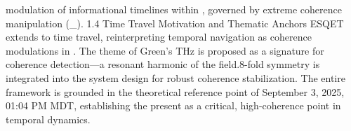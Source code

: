 modulation of informational timelines within , governed by extreme coherence manipulation (\Gamma_{}). ​1.4 Time Travel Motivation and Thematic Anchors ​ESQET extends to time travel, reinterpreting temporal navigation as coherence modulations in . ​The theme of Green's  THz is proposed as a signature for coherence detection—a resonant harmonic of the  field. ​8-fold symmetry is integrated into the system design for robust coherence stabilization. ​The entire framework is grounded in the theoretical reference point of September 3, 2025, 01:04 PM MDT, establishing the present as a critical, high-coherence point in temporal dynamics.
